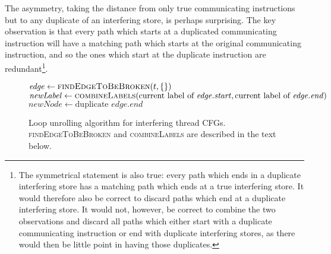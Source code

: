 The asymmetry, taking the distance from only true communicating
instructions but to any duplicate of an interfering store, is perhaps
surprising.  The key observation is that every path which starts at a
duplicated communicating instruction will have a matching path which
starts at the original communicating instruction, and so the ones
which start at the duplicate instruction are redundant\footnote{The
  symmetrical statement is also true: every path which ends in a
  duplicate interfering store has a matching path which ends at a true
  interfering store.  It would therefore also be correct to discard
  paths which end at a duplicate interfering store.  It would not,
  however, be correct to combine the two observations and discard all
  paths which either start with a duplicate communicating instruction
  or end with duplicate interfering stores, as there would then be
  little point in having those duplicates.}.

\begin{figure}
\begin{algorithmic}
       \State $\mathit{edge} \gets \textsc{findEdgeToBeBroken}(t, \{\})$
       \State $\mathit{newLabel} \gets \textsc{combineLabels}(\text{current label of } \mathit{edge}.\mathit{start}, \text{current label of } \mathit{edge}.\mathit{end})$
       \Else
           \State $\mathit{newNode} \gets \text{duplicate } \mathit{edge}.\mathit{end}$
           \EndFor
       \EndIf
    \EndWhile
  \EndFor
\end{algorithmic}
\caption{Loop unrolling algorithm for interfering thread CFGs.
  \textsc{findEdgeToBeBroken} and \textsc{combineLabels} are described
  in the text below.}
\label{fig:derive:store_cfg_unroll_alg}
\end{figure}


